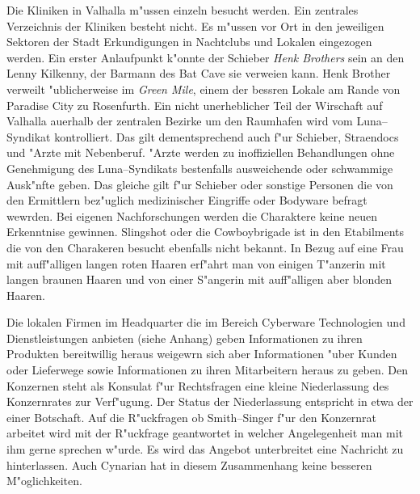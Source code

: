 Die Kliniken in Valhalla m"ussen einzeln besucht werden. Ein zentrales Verzeichnis der Kliniken besteht nicht. Es m"ussen vor Ort in den jeweiligen Sektoren der Stadt Erkundigungen in Nachtclubs und Lokalen eingezogen werden. Ein erster Anlaufpunkt k"onnte der Schieber \emph{Henk Brothers} sein an den Lenny Kilkenny, der Barmann des Bat Cave sie verwei\3en kann. Henk Brother verweilt "ublicherweise im \emph{Green Mile}, einem der bessren Lokale am Rande von Paradise City zu Rosenfurth. Ein nicht unerheblicher Teil der Wirschaft auf Valhalla au\3erhalb der zentralen Bezirke um den Raumhafen wird vom Luna--Syndikat kontrolliert. Das gilt dementsprechend auch f"ur Schieber, Stra\3endocs und "Arzte mit Nebenberuf. "Arzte werden zu inoffiziellen Behandlungen ohne Genehmigung des Luna--Syndikats bestenfalls ausweichende oder schwammige Ausk"nfte geben. Das gleiche gilt f"ur Schieber oder sonstige Personen die von den Ermittlern bez"uglich medizinischer Eingriffe oder Bodyware befragt wewrden. Bei eigenen Nachforschungen werden die Charaktere keine neuen Erkenntnise gewinnen. Slingshot oder die Cowboybrigade ist in den Etabilments die von den Charakeren besucht ebenfalls  nicht bekannt. In Bezug auf eine Frau mit auff"alligen langen roten Haaren erf"ahrt man von einigen T"anzerin mit langen braunen Haaren und von einer S"angerin mit auff"alligen aber blonden Haaren.

Die lokalen Firmen im Headquarter die im Bereich Cyberware Technologien und Dienstleistungen anbieten (siehe Anhang) geben Informationen zu ihren Produkten bereitwillig heraus weigewrn sich aber Informationen "uber Kunden oder Lieferwege sowie Informationen zu ihren Mitarbeitern heraus zu geben. Den Konzernen steht als Konsulat f"ur Rechtsfragen eine kleine Niederlassung des Konzernrates zur Verf"ugung. Der Status der Niederlassung entspricht in etwa der einer Botschaft. Auf die R"uckfragen ob Smith--Singer f"ur den Konzernrat arbeitet wird mit der R"uckfrage geantwortet in welcher Angelegenheit man mit ihm gerne sprechen w"urde. Es wird das Angebot unterbreitet eine Nachricht zu hinterlassen. Auch Cynarian hat in diesem Zusammenhang keine besseren M"oglichkeiten.

